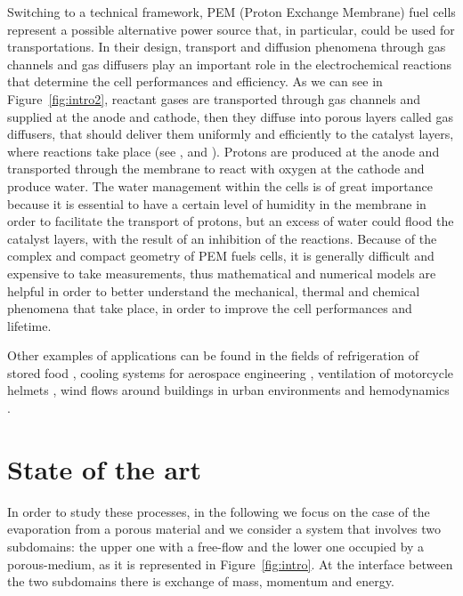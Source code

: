 Switching to a technical framework, PEM (Proton Exchange Membrane) fuel cells represent a possible alternative power source that, in particular, could be used for transportations. In their design, transport and diffusion phenomena through gas channels and gas diffusers play an important role in the electrochemical reactions that determine the cell performances and efficiency. As we can see in Figure~\ref{fig:intro2}, reactant gases are transported through gas channels and supplied at the anode and cathode, then they diffuse into porous layers called gas diffusers, that should deliver them uniformly and efficiently to the catalyst layers, where reactions take place (see \cite{wu:fuelcell}, \cite{tesi:baber} and \cite{tesi:pem}). Protons are produced at the anode and transported through the membrane to react with oxygen at the cathode and produce water. The water management within the cells is of great importance because it is essential to have a certain level of humidity in the membrane in order to facilitate the transport of protons, but an excess of water could flood the catalyst layers, with the result of an inhibition of the reactions.
Because of the complex and compact geometry of PEM fuels cells, it is generally difficult and expensive to take measurements, thus mathematical and numerical models are helpful in order to better understand the mechanical, thermal and chemical phenomena that take place, in order to improve the cell performances and lifetime.

Other examples of applications can be found in the fields of refrigeration of stored food \cite{intro:food}, cooling systems for aerospace engineering \cite{intro:aero}, ventilation of motorcycle helmets \cite{intro:discacim}, wind flows around buildings in urban environments \cite{intro:buildings} and hemodynamics \cite{intro:med}.

\section{State of the art}
In order to study these processes, in the following we focus on the case of the evaporation from 
a porous material and we consider a system that involves two subdomains: the 
upper one with a free-flow and the lower one occupied by a porous-medium, as it is represented in Figure~\ref{fig:intro}.
At the interface between the two subdomains there is exchange of mass, momentum 
and energy.

